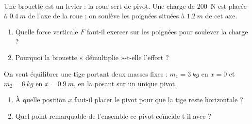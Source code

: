 \documentclass[11pt,a4paper]{article}
\newcommand{\vv}[1]{\vec{#1}}\newcommand{\ds}{\displaystyle}
\begin{document}
\begin{exo}[la brouette]
Une brouette est un levier : la roue sert de pivot. Une charge de \qty{200}{N} est placée à
$\qty{0.4}{m}$ de l'axe de la roue ; on soulève les poignées situées à $\qty{1.2}{m}$ de cet axe.
\begin{center}
\end{center}
\begin{enumerate}[label=\alph*)]
  \item Quelle force verticale $F$ faut-il exercer sur les poignées pour soulever la charge ?
  \item Pourquoi la brouette « démultiplie »-t-elle l'effort ?
\end{enumerate}
\end{exo}

\begin{exo}
On veut équilibrer une tige portant deux masses fixes : $m_1=\qty{3}{kg}$ en $x=0$ et
$m_2=\qty{6}{kg}$ en $x=\qty{0.9}{m}$, en la posant sur un unique pivot.
\begin{enumerate}[label=\alph*)]
  \item À quelle position $x$ faut-il placer le pivot pour que la tige reste horizontale ?
  \item Quel point remarquable de l'ensemble ce pivot coïncide-t-il avec ?
\end{enumerate}
\end{exo}
\end{document}
